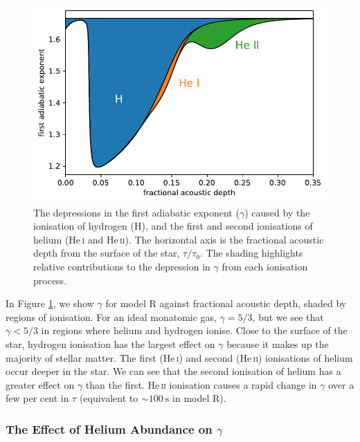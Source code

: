 \begin{figure}[tb]
    \centering
    \includegraphics{figures/adiabatic-ionisation-regions.pdf}
    \caption[The depressions in the first adiabatic exponent caused by the ionisation of hydrogen and helium.]{The depressions in the first adiabatic exponent (\(\gamma\)) caused by the ionisation of hydrogen (H), and the first and second ionisations of helium (He\,\textsc{i} and He\,\textsc{ii}). The horizontal axis is the fractional acoustic depth from the surface of the star, \(\tau/\tau_0\). The shading highlights relative contributions to the depression in \(\gamma\) from each ionisation process.}
    \label{fig:gamma-zones}
\end{figure}

In Figure \ref{fig:gamma-zones}, we show \(\gamma\) for model R against fractional acoustic depth, shaded by regions of ionisation. For an ideal monatomic gas, \(\gamma=5/3\), but we see that \(\gamma < 5/3\) in regions where helium and hydrogen ionise. Close to the surface of the star, hydrogen ionisation has the largest effect on \(\gamma\) because it makes up the majority of stellar matter. The first (He\,\textsc{i}) and second (He\,\textsc{ii}) ionisations of helium occur deeper in the star. We can see that the second ionisation of helium has a greater effect on \(\gamma\) than the first. He\,\textsc{ii} ionisation causes a rapid change in \(\gamma\) over a few per cent in \(\tau\) (equivalent to \(\sim \SI{100}{\second}\) in model R).

\subsubsection{The Effect of Helium Abundance on \(\gamma\)}

